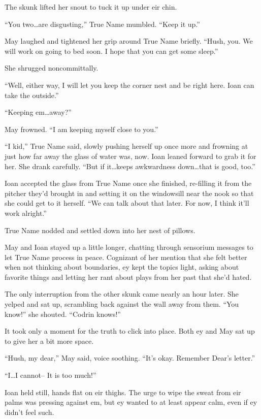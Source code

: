 The skunk lifted her snout to tuck it up under eir chin.

``You two\ldots are disgusting,'' True Name mumbled. ``Keep it up.''

May laughed and tightened her grip around True Name briefly. ``Hush, you. We will work on going to bed soon. I hope that you can get some sleep.''

She shrugged noncommittally.

``Well, either way, I will let you keep the corner nest and be right here. Ioan can take the outside.''

``Keeping em\ldots away?''

May frowned. ``I am keeping myself close to you.''

``I kid,'' True Name said, slowly pushing herself up once more and frowning at just how far away the glass of water was, now. Ioan leaned forward to grab it for her. She drank carefully. ``But if it\ldots keeps awkwardness down\ldots that is good, too.''

Ioan accepted the glass from True Name once she finished, re-filling it from the pitcher they'd brought in and setting it on the windowsill near the nook so that she could get to it herself. ``We can talk about that later. For now, I think it'll work alright.''

True Name nodded and settled down into her nest of pillows.

May and Ioan stayed up a little longer, chatting through sensorium messages to let True Name process in peace. Cognizant of her mention that she felt better when not thinking about boundaries, ey kept the topics light, asking about favorite things and letting her rant about plays from her past that she'd hated.

The only interruption from the other skunk came nearly an hour later. She yelped and sat up, scrambling back against the wall away from them. ``You know!'' she shouted. ``Codrin knows!''

It took only a moment for the truth to click into place. Both ey and May sat up to give her a bit more space.

``Hush, my dear,'' May said, voice soothing. ``It's okay. Remember Dear's letter.''

``I\ldots I cannot-- It is too much!''

Ioan held still, hands flat on eir thighs. The urge to wipe the sweat from eir palms was pressing against em, but ey wanted to at least appear calm, even if ey didn't feel such.


